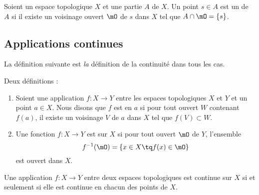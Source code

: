 \begin{definition}      \label{DEFooXIOWooWUKJhN}
	Soient un espace topologique \( X\) et une partie \( A\) de \( X\). Un point \( s\in A \) est un  de \( A\) si il existe un voisinage ouvert \( \mO\) de \( s\) dans \( X\) tel que \( A\cap\mO=\{ s \}\).
\end{definition}

\subsection{Applications continues}

La définition suivante est \emph{la} définition de la continuité dans tous les cas.
\begin{definition}\label{DefOLNtrxB}
	Deux définitions :
	\begin{enumerate}
		\item   \label{ITEMooXARPooNzsWLr}
		      Soient une application \( f\colon X\to Y\) entre les espaces topologiques \( X\) et \( Y\) et un point \( a\in X\). Nous disons que \( f\) est  en \( a\) si pour tout ouvert \( W\) contenant \( f(a)\), il existe un voisinage \( V\) de \( a\) dans \( X\) tel que \( f(V)\subset W\).
		\item       \label{ITEMooEHGWooDdITRV}
		      Une fonction \( f\colon X\to Y\) est  sur \( X\) si pour tout ouvert \( \mO\) de \( Y\), l'ensemble
		      \begin{equation}      \label{defFminus1ofaset}
			      f^{-1}(\mO) = \{ x \in X \tq f(x) \in \mO\}
		      \end{equation}
		      est ouvert dans \( X\).
	\end{enumerate}
\end{definition}

\begin{proposition}		\label{PROPooOVKEooCkJmmO}
	Une application \(f \colon X\to Y  \) entre deux espaces topologiques est continue sur \( X\) si et seulement si elle est continue en chacun des points de \( X\).
\end{proposition}

